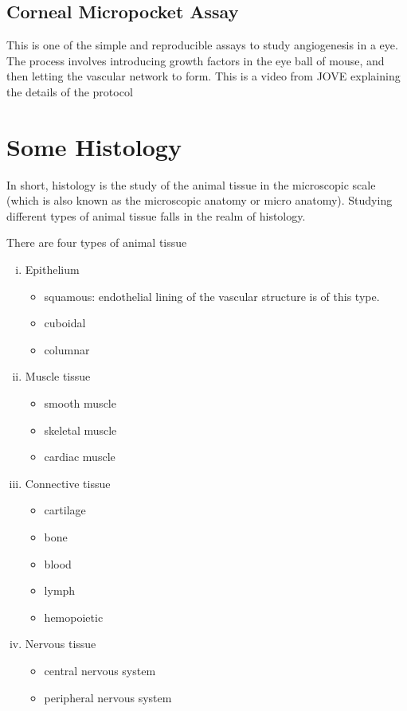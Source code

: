 \subsection{Corneal Micropocket Assay}
This is one of the simple and reproducible assays to study angiogenesis in a eye. The process involves introducing growth factors in the eye ball of mouse, and then letting the vascular network to form. This is a video from JOVE explaining the details of the protocol \citep{conealMicroPocketAssayJOVE}



\section{Some Histology} 

In short, histology is the study of the animal tissue in the microscopic scale (which is also known as the microscopic anatomy or micro anatomy). Studying different types of animal tissue falls in the realm of histology.

\noindent There are four types of animal tissue 
\begin{enumerate}[(i),noitemsep]
	\item Epithelium
	\begin{itemize}
		\item squamous: endothelial lining of the vascular structure is of this type.
		\item cuboidal
		\item columnar
	\end{itemize}
	\item Muscle tissue
	\begin{itemize}
		\item smooth muscle
		\item skeletal muscle
		\item cardiac muscle
	\end{itemize}
	\item Connective tissue
	\begin{itemize}
		\item cartilage
		\item bone
		\item blood
		\item lymph
		\item hemopoietic
	\end{itemize}
	\item Nervous tissue
	\begin{itemize}
		\item central nervous system
		\item peripheral nervous system
	\end{itemize}
\end{enumerate}

